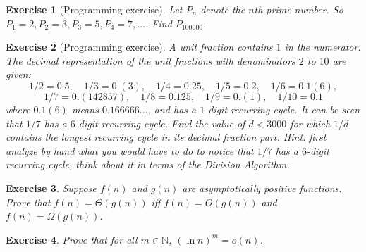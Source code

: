 \documentclass[11pt]{amsart}
\theoremstyle{theorem}
\newtheorem{exercise}{Exercise}
\newcommand\N{\mathbb{N}}
\begin{document}
\begin{exercise}[Programming exercise]
Let $P_n$ denote the $n$th prime number. So $P_1=2, P_2=3, P_3=5, P_4=7,\ldots$. Find $P_{100000}$.
\end{exercise}


\begin{exercise}[Programming exercise]
A unit fraction contains $1$ in the numerator. The decimal representation of the unit fractions with denominators $2$ to $10$ are given:
\[
1/2 = 0.5, \quad 1/3 = 0.(3),\quad 1/4 =0.25,\quad 1/5 = 0.2,\quad 1/6 = 0.1(6),
\]
\[
 1/7=0.(142857),\quad 1/8=0.125,\quad 1/9=0.(1),\quad 1/10=0.1
\]
where $0.1(6)$ means $0.166666...$, and has a $1$-digit recurring cycle. It can be seen that $1/7$ has a $6$-digit recurring cycle. Find the value of $d<3000$ for which $1/d$ contains the longest recurring cycle in its decimal fraction part. Hint: first analyze by hand what you would have to do to notice that $1/7$ has a $6$-digit recurring cycle, think about it in terms of the Division Algorithm.
\end{exercise}

\begin{exercise}
Suppose $f(n)$ and $g(n)$ are asymptotically positive functions. Prove that $f(n)=\Theta(g(n))$ iff $f(n)=O(g(n))$ and $f(n)=\Omega(g(n))$.
\end{exercise}


\begin{exercise}
Prove that for all $m\in\N$, $(\ln n)^m = o(n)$.
\end{exercise}
\end{document}
